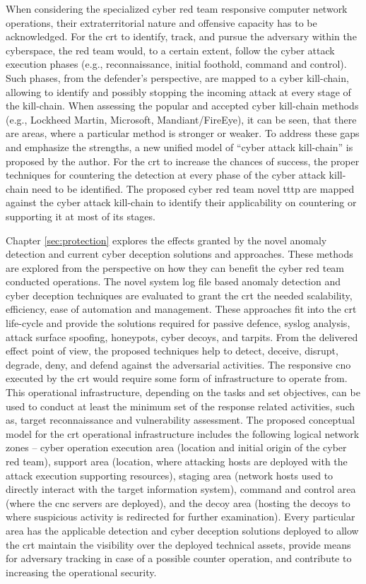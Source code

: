 When considering the specialized cyber red team responsive computer network operations, their extraterritorial nature and offensive capacity has to be acknowledged. For the \gls{crt} to identify, track, and pursue the adversary within the cyberspace, the red team would, to a certain extent, follow the cyber attack execution phases (e.g., reconnaissance, initial foothold, command and control). Such phases, from the defender's perspective, are mapped to a cyber kill-chain, allowing to identify and possibly stopping the incoming attack at every stage of the kill-chain. When assessing the popular and accepted cyber kill-chain methods (e.g., Lockheed Martin, Microsoft, Mandiant/FireEye), it can be seen, that there are areas, where a particular method is stronger or weaker. To address these gaps and emphasize the strengths, a new unified model of ``cyber attack kill-chain'' is proposed by the author. For the \gls{crt} to increase the chances of success, the proper techniques for countering the detection at every phase of the cyber attack kill-chain need to be identified. The proposed cyber red team novel \gls{tttp} are mapped against the cyber attack kill-chain to identify their applicability on countering or supporting it at most of its stages.

Chapter \ref{sec:protection} explores the effects granted by the novel anomaly detection and current cyber deception solutions and approaches. These methods are explored from the perspective on how they can benefit the cyber red team conducted operations. The novel system log file based anomaly detection and cyber deception techniques are evaluated to grant the \gls{crt} the needed scalability, efficiency, ease of automation and management. These approaches fit into the \gls{crt} life-cycle and provide the solutions required for passive defence, syslog analysis, attack surface spoofing, honeypots, cyber decoys, and tarpits. From the delivered effect point of view, the proposed techniques help to detect, deceive, disrupt, degrade, deny, and defend against the adversarial activities.
The responsive \gls{cno} executed by the \gls{crt} would require some form of infrastructure to operate from. This operational infrastructure, depending on the tasks and set objectives, can be used to conduct at least the minimum set of the response related activities, such as, target reconnaissance and vulnerability assessment. The proposed conceptual model for the \gls{crt} operational infrastructure includes the following logical network zones -- cyber operation execution area (location and initial origin of the cyber red team), support area (location, where attacking hosts are deployed with the attack execution supporting resources), staging area (network hosts used to directly interact with the target information system), command and control area (where the \gls{cnc} servers are deployed), and the decoy area (hosting the decoys to where suspicious activity is redirected for further examination). Every particular area has the applicable detection and cyber deception solutions deployed to allow the \gls{crt} maintain the visibility over the deployed technical assets, provide means for adversary tracking in case of a possible counter operation, and contribute to increasing the operational security.

